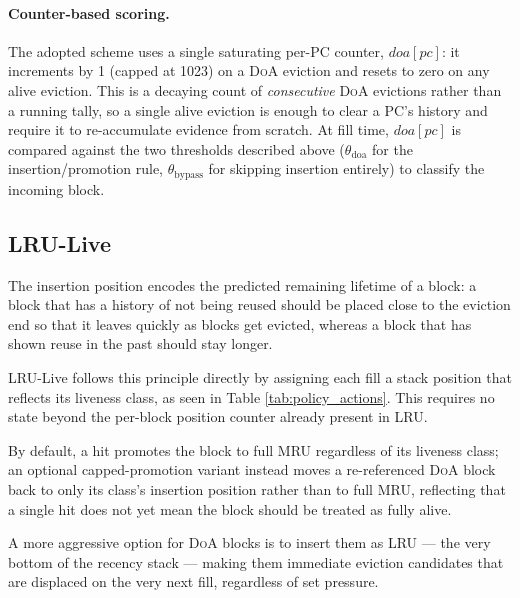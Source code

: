 \documentclass[conference]{IEEEtran}
\newcommand{\lru}{\textsc{LRU}\xspace}
\newcommand{\doa}{\textsc{DoA}\xspace}
\begin{document}
\paragraph{Counter-based scoring.}
The adopted scheme uses a single saturating per-\textsc{PC} counter,
$\mathit{doa}[pc]$: it increments by 1 (capped at 1023) on a \doa eviction and
resets to zero on any alive eviction. This is a decaying count of
\emph{consecutive} \doa evictions rather than a running tally, so a single
alive eviction is enough to clear a \textsc{PC}'s history and require it to
re-accumulate evidence from scratch. At fill time, $\mathit{doa}[pc]$ is
compared against the two thresholds described above ($\theta_{\mathrm{doa}}$
for the insertion/promotion rule, $\theta_{\mathrm{bypass}}$ for skipping
insertion entirely) to classify the incoming block.

\subsection{LRU-Live}

The insertion position encodes the predicted remaining lifetime of a block:
a block that has a history of not being reused should be placed close to the
eviction end so that it leaves quickly as blocks get evicted, whereas a block
that has shown reuse in the past should stay longer.


\lru-Live follows this principle directly by assigning each fill a stack position
that reflects its liveness class, as seen in Table \ref{tab:policy_actions}.
This requires no state beyond the per-block position counter already present in \lru.

By default, a hit promotes the block to full \textsc{MRU} regardless of its
liveness class; an optional capped-promotion variant instead moves a
re-referenced \doa block back to only its class's insertion position rather
than to full \textsc{MRU}, reflecting that a single hit does not yet mean the
block should be treated as fully alive.

A more aggressive option for \doa blocks is to insert them as LRU --- the
very bottom of the recency stack --- making them immediate eviction candidates
that are displaced on the very next fill, regardless of set pressure.
\end{document}
